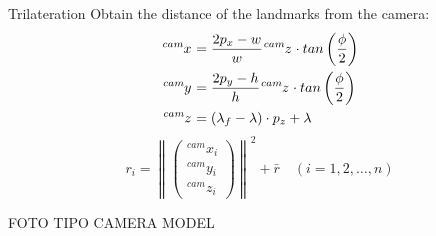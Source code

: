 \documentclass[10pt]{beamer}
\newcommand\norm[1]{\left\lVert#1\right\rVert}
\begin{document}
    \begin{frame}[fragile]{Trilateration}
        Obtain the distance of the landmarks from the camera:
        \begin{align*}
            \tensor[^{cam}]{x}{} &= \frac{2 p_x - w}{w} \tensor[^{cam}]{z}{} \cdot tan\left(\frac{\phi}{2}\right) \\
            \tensor[^{cam}]{y}{} &= \frac{2 p_y - h}{h} \tensor[^{cam}]{z}{} \cdot tan\left(\frac{\phi}{2}\right) \\
            \tensor[^{cam}]{z}{} &= (\lambda_f - \lambda) \cdot p_z + \lambda \\
        \end{align*}
        \vspace{-1cm}
        \begin{equation*}
            r_i =
            \norm{
                \begin{pmatrix}
                    ^{cam}{x}{_i} \\
                    ^{cam}{y}{_i} \\
                    ^{cam}{z}{_i}
                \end{pmatrix}
                }^2 + \bar{r} \quad (i = 1, 2, \dots, n)
        \end{equation*}

        FOTO TIPO CAMERA MODEL
    \end{frame}
\end{document}
